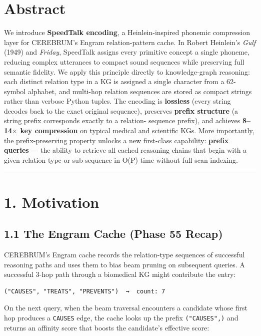 
\section*{Abstract}

We introduce \textbf{SpeedTalk encoding}, a Heinlein-inspired phonemic compression layer
for CEREBRUM's Engram relation-pattern cache.  In Robert Heinlein's \textit{Gulf} (1949) and
\textit{Friday}, SpeedTalk assigns every primitive concept a single phoneme, reducing complex
utterances to compact sound sequences while preserving full semantic fidelity.  We
apply this principle directly to knowledge-graph reasoning: each distinct relation type
in a KG is assigned a single character from a 62-symbol alphabet, and multi-hop
relation sequences are stored as compact strings rather than verbose Python tuples.
The encoding is \textbf{lossless} (every string decodes back to the exact original sequence),
preserves \textbf{prefix structure} (a string prefix corresponds exactly to a relation-
sequence prefix), and achieves \textbf{8--14$\times$ key compression} on typical medical and
scientific KGs.  More importantly, the prefix-preserving property unlocks a new
first-class capability: \textbf{prefix queries} --- the ability to retrieve all cached
reasoning chains that begin with a given relation type or sub-sequence in O(P)
time without full-scan indexing.

\medskip\noindent\rule{\linewidth}{0.4pt}\medskip

\section*{1. Motivation}

\subsection*{1.1 The Engram Cache (Phase 55 Recap)}

CEREBRUM's Engram cache records the
relation-type sequences of successful reasoning paths and uses them to bias beam
pruning on subsequent queries.  A successful 3-hop path through a biomedical KG might
contribute the entry:

\begin{lstlisting}
("CAUSES", "TREATS", "PREVENTS")  →  count: 7
\end{lstlisting}

On the next query, when the beam traversal encounters a candidate whose first hop
produces a \texttt{CAUSES} edge, the cache looks up the prefix \texttt{("CAUSES",)} and returns
an affinity score that boosts the candidate's effective score:

